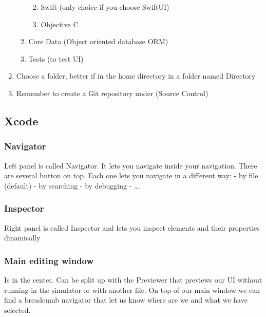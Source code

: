 \documentclass[]{article}
\providecommand{\tightlist}{%
  \setlength{\itemsep}{0pt}\setlength{\parskip}{0pt}}
\begin{document}
\begin{enumerate}
\begin{enumerate}
    \begin{enumerate}
    \def\labelenumiii{\arabic{enumiii}.}
    \tightlist
    \item
      Swift (only choice if you choose SwiftUI)
    \item
      Objective C
    \end{enumerate}
  \item
    Core Data (Object oriented database ORM)
  \item
    Tests (to test UI)
  \end{enumerate}
\item
  Choose a folder, better if in the home directory in a folder named
  Directory
\item
  Remember to create a Git repository under (Source Control)
\end{enumerate}

\hypertarget{xcode}{%
\subsection{Xcode}\label{xcode}}

\hypertarget{navigator}{%
\subsubsection{Navigator}\label{navigator}}

Left panel is called Navigator. It lets you navigate inside your
navigation. There are several button on top. Each one lets you navigate
in a different way: - by file (default) - by searching - by debugging -
\ldots{}.

\hypertarget{inspector}{%
\subsubsection{Inspector}\label{inspector}}

Right panel is called Inspector and lets you inspect elements and their
properties dinamically

\hypertarget{main-editing-window}{%
\subsubsection{Main editing window}\label{main-editing-window}}

Is in the center. Can be split up with the Previewer that previews our
UI without running in the simulator or with another file. On top of our
main window we can find a breadcumb navigator that let us know where are
we and what we have selected.
\end{document}
